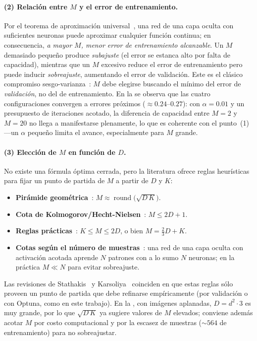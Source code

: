 \documentclass[11pt,a4paper]{article}
\begin{document}
\paragraph{(2) Relación entre $M$ y el error de entrenamiento.}
Por el teorema de aproximación universal~\cite{cybenko1989,hornik1989}, una red
de una capa oculta con suficientes neuronas puede aproximar cualquier función
continua; en consecuencia, \emph{a mayor $M$, menor error de entrenamiento
alcanzable}. Un $M$ demasiado pequeño produce \emph{subajuste} (el error se
estanca alto por falta de capacidad), mientras que un $M$ excesivo reduce el
error de entrenamiento pero puede inducir \emph{sobreajuste}, aumentando el
error de validación. Este es el clásico compromiso sesgo-varianza~\cite{geman1992}:
$M$ debe elegirse buscando el mínimo del error de \emph{validación}, no del de
entrenamiento. En la  se observa que las cuatro
configuraciones convergen a errores próximos ($\approx 0.24$--$0.27$): con
$\alpha=0.01$ y un presupuesto de iteraciones acotado, la diferencia de
capacidad entre $M=2$ y $M=20$ no llega a manifestarse plenamente, lo que es
coherente con el punto~(1) —un $\alpha$ pequeño limita el avance, especialmente
para $M$ grande.

\paragraph{(3) Elección de $M$ en función de $D$.}
No existe una fórmula óptima cerrada, pero la literatura ofrece reglas
heurísticas para fijar un punto de partida de $M$ a partir de $D$ y $K$:
\begin{itemize}[nosep]
  \item \textbf{Pirámide geométrica}~\cite{masters1993}:
        $M\approx\operatorname{round}\!\bigl(\sqrt{D\,K}\bigr)$.
  \item \textbf{Cota de Kolmogorov/Hecht-Nielsen}~\cite{hechtnielsen1987}:
        $M\le 2D+1$.
  \item \textbf{Reglas prácticas}~\cite{heaton2008}: $K\le M\le 2D$, o bien
        $M=\tfrac{2}{3}D+K$.
  \item \textbf{Cotas según el número de muestras}~\cite{huang1998}: una red de
        una capa oculta con activación acotada aprende $N$ patrones con a lo
        sumo $N$ neuronas; en la práctica $M\ll N$ para evitar sobreajuste.
\end{itemize}
Las revisiones de Stathakis~\cite{stathakis2009} y Karsoliya~\cite{karsoliya2012}
coinciden en que estas reglas sólo proveen un punto de partida que debe
refinarse empíricamente (por validación o con Optuna, como en este trabajo). En
la , con imágenes aplanadas, $D=d^2\cdot 3$ es muy grande, por
lo que $\sqrt{D\,K}$ ya sugiere valores de $M$ elevados; conviene además acotar
$M$ por costo computacional y por la escasez de muestras ($\sim 564$ de
entrenamiento) para no sobreajustar.
\end{document}
